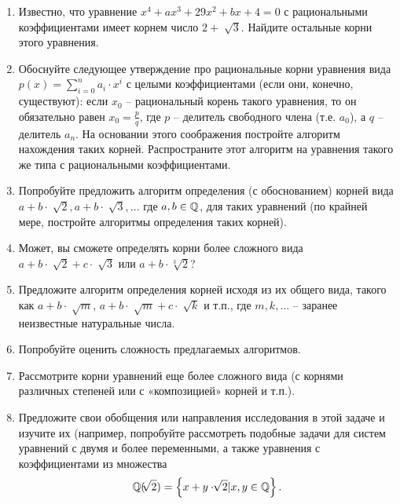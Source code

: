 \begin{enumerate}
\item Известно, что уравнение $x^4+ax^3+29x^2+bx+4=0$ с рациональными коэффициентами имеет корнем число $2+\sqrt[] 3 $. Найдите остальные корни этого уравнения.
\item Обоснуйте следующее утверждение про рациональные корни уравнения вида $p(x)=\sum_{i=0}^n a_i \cdot x^i$ с целыми коэффициентами (если они, конечно, существуют): если $x_0$ – рациональный корень такого уравнения, то он обязательно равен $x_0={\frac{p}{q}}$, где $p$ – делитель свободного члена (т.е. $a_0$), а $q$ – делитель $a_n$. На основании этого соображения постройте алгоритм нахождения таких корней. Распространите этот алгоритм на уравнения такого же типа с рациональными коэффициентами.
\item Попробуйте предложить алгоритм определения (с обоснованием) корней вида $a+b\cdot \sqrt[] 2, a+b\cdot \sqrt[] 3,\dots$ где $a, b \in \mathbb{Q}$, для таких уравнений (по крайней мере, постройте алгоритмы определения таких корней).
\item Может, вы сможете определять корни более сложного вида $a+b\cdot \sqrt[]2 +c\cdot \sqrt[] 3$ или $a+b\cdot \sqrt[3] 2$?
\item Предложите алгоритм определения корней исходя из их общего вида, такого как $a+b \cdot \sqrt[] m$, $a+b\cdot \sqrt[] m + c\cdot \sqrt[] k$ и т.п., где $m, k,\dots$ – заранее неизвестные натуральные числа.
\item Попробуйте оценить сложность предлагаемых алгоритмов.
\item Рассмотрите корни уравнений еще более сложного вида (с корнями различных степеней или с «композицией» корней и т.п.).
\item Предложите свои обобщения или направления исследования в этой задаче и изучите их (например, попробуйте рассмотреть подобные задачи для систем уравнений с двумя и более переменными, а также уравнения с коэффициентами из множества
$$\mathbb{Q}(\sqrt[]2) = \left\{x+y \cdot \sqrt[]2|x,y \in \mathbb{Q} \right\}.$$
\end{enumerate}


